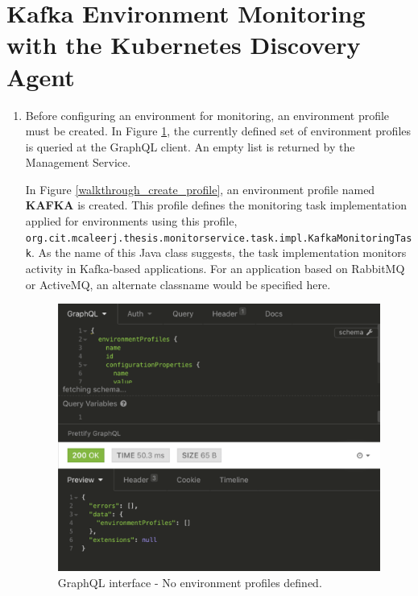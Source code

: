 \section{Kafka Environment Monitoring with the Kubernetes Discovery Agent}

\begin{enumerate}
	\item Before configuring an environment for monitoring, an environment profile must be created. In Figure \ref{walkthrough_no_profiles}, the currently defined set of environment profiles is queried at the GraphQL client. An empty list is returned by the Management Service. \linebreak

	In Figure \ref{walkthrough_create_profile}, an environment profile named \textbf{KAFKA} is created. This profile defines the monitoring task implementation applied for environments using this profile, \texttt{org.cit.mcaleerj.thesis.monitorservice.task.impl.KafkaMonitoringTask}. As the name of this Java class suggests, the task implementation monitors activity in Kafka-based applications. For an application based on RabbitMQ or ActiveMQ, an alternate classname would be specified here.

 \begin{figure}[H]
	\centering  
	\includegraphics[scale=0.9]{figures/walkthrough/no-env-profiles.png}
	\caption{GraphQL interface - No environment profiles defined.}
	\label{walkthrough_no_profiles}
\end{figure}


\end{enumerate}

